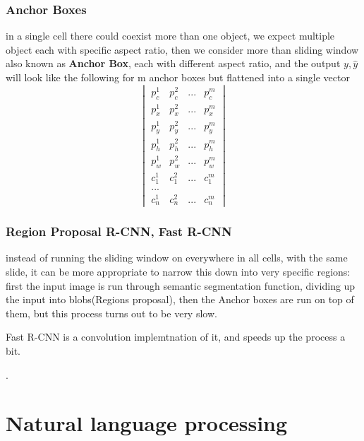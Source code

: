 \documentclass[4apaper,12pt]{book}
\begin{document}
\begin{description}
        \subsection{Anchor Boxes}
        \begin{description}
        \item in a single cell there could coexist more than one object, we expect multiple object each with specific aspect ratio, then we consider more than sliding window also known as \textbf{Anchor Box}, each with different aspect ratio, and the output $y,\hat{y}$ will look like the following for m anchor boxes but flattened into a single vector $$ \begin{vmatrix}p_c^1&p_c^{2}&...&p_c^{m}\\p_x^{1}&p_x^{2}&...&p_x^{m}\\p_y^{1}&p_y^{2}&...&p_y^{m}\\p_h^{1}&p_h^{2}&...&p_h^{m}\\p_w^{1}&p_w^2&...&p_w^{m}\\c_1^{1}&c_1^{2}&...&c_1^{m}\\...\\c_n^{1}&c_n^{2}&...&c_n^{m}\end{vmatrix}$$
        \end{description}
        \subsection{Region Proposal R-CNN, Fast R-CNN}
        \begin{description}
        \item instead of running the sliding window on everywhere in all cells, with the same slide, it can be more appropriate to narrow this down into very specific regions: first the input image is run through semantic segmentation function, dividing up the input into blobs(Regions proposal), then the Anchor boxes are run on top of them, but this process turns out to be very slow.
        \item Fast R-CNN is a convolution implemtnation of it, and speeds up the process a bit.
          \end{description}
        \item .
  \end{description}

  \chapter{Natural language processing}
\end{document}
